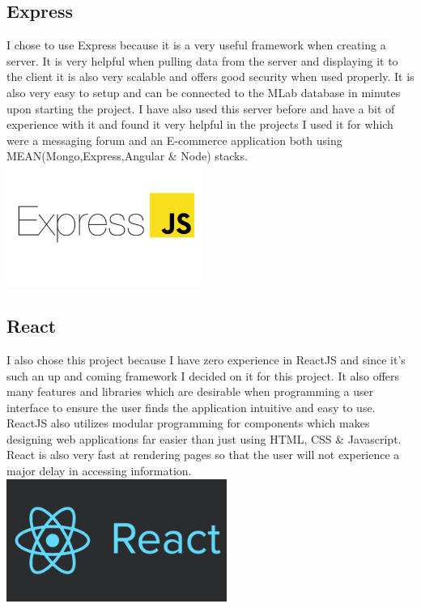 \subsection{Express}
I chose to use Express because it is a very useful framework when creating a server.
It is very helpful when pulling data from the server and displaying it to the client
it is also very scalable and offers good security when used properly.  It is also very
easy to setup and can be connected to the MLab database in minutes upon starting the
project.  I have also used this server before and have a bit of experience with it and
found it very helpful in the projects I used it for which were a messaging forum and an
E-commerce application both using MEAN(Mongo,Express,Angular \& Node) stacks.
\\
\includegraphics[width=\textwidth,height=4cm]{img/Express.png} \cite{ExpressImage}
\\
\subsection{React}
I also chose this project because I have zero experience in ReactJS and since
it's such an up and coming framework I decided on it for this project. It also
offers many features and libraries which are desirable when programming a user
interface to ensure the user finds the application intuitive and easy to use.
ReactJS also utilizes modular programming for components which makes designing
web applications far easier than just using HTML, CSS \& Javascript. React is
also very fast at rendering pages so that the user will not experience a major
delay in accessing information.
\\
\includegraphics[width=\textwidth,height=4cm]{img/react.png} \cite{ReactImage}
\\
